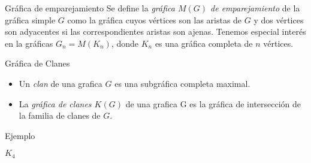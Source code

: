 \documentclass[final,xcolor=svgnames]{beamer}
\begin{document}
\begin{frame}{}
\begin{columns}
\begin{column}{0.5\textwidth}
      \begin{block}{Gráfica de emparejamiento}
        Se define la \emph{gráfica $M(G)$ de emparejamiento} de la gráfica
        simple $G$ como la gráfica cuyos vértices son las aristas de
        $G$ y dos vértices son adyacentes si las correspondientes
        aristas son ajenas. Tenemos especial interés en la gráficas
        $G_{n}=M(K_{n})$, donde $K_{n}$ es una gráfica completa de $n$ vértices.
      \end{block}


      \begin{block}{Gráfica de Clanes}
        \begin{itemize}
        \item Un \textit{clan} de una grafica $G$ es una subgráfica completa maximal. 
        \item La \textit{gráfica de clanes $K(G)$} de una grafica G es la gráfica de intersección de
          la familia de clanes de $G$.   
        \end{itemize}

      \end{block}
      
      \begin{block}{Ejemplo}
        \begin{minipage}{0.3\linewidth} 
          \centering
          
          $K_{4}$
        \end{minipage}
        \begin{minipage}{0.3\linewidth}    
          \centering


\end{minipage}
\end{block}
\end{column}
\end{columns}
\end{frame}
\end{document}
